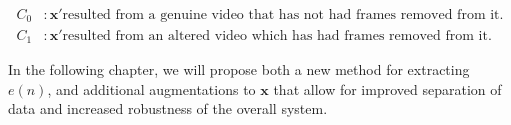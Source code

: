 \begin{equation}
\begin{aligned}
  C_{0} &: \bm{x}' \text{resulted from a genuine video that has not had frames removed from it.} \\
  C_{1} &: \bm{x}' \text{resulted from an altered video which has had frames removed from it.}
\end{aligned}
\end{equation}

In the following chapter, we will propose both a new method for extracting $e(n)$, and additional augmentations to $\bm{x}$ that allow for improved separation of data and increased robustness of the overall system.
